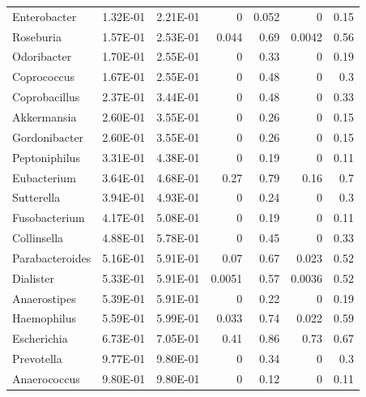 {\begin{longtable}{ | l | r | r | r | r | r | r  | }
		Enterobacter & 1.32E-01 & 2.21E-01 & 0 & 0.052 & 0 & 0.15 \\ 
		Roseburia & 1.57E-01 & 2.53E-01 & 0.044 & 0.69 & 0.0042 & 0.56 \\ 
		Odoribacter & 1.70E-01 & 2.55E-01 & 0 & 0.33 & 0 & 0.19 \\ 
		Coprococcus & 1.67E-01 & 2.55E-01 & 0 & 0.48 & 0 & 0.3 \\ 
		Coprobacillus & 2.37E-01 & 3.44E-01 & 0 & 0.48 & 0 & 0.33 \\ 
		Akkermansia & 2.60E-01 & 3.55E-01 & 0 & 0.26 & 0 & 0.15 \\ 
		Gordonibacter & 2.60E-01 & 3.55E-01 & 0 & 0.26 & 0 & 0.15 \\ 
		Peptoniphilus & 3.31E-01 & 4.38E-01 & 0 & 0.19 & 0 & 0.11 \\ 
		Eubacterium & 3.64E-01 & 4.68E-01 & 0.27 & 0.79 & 0.16 & 0.7 \\ 
		Sutterella & 3.94E-01 & 4.93E-01 & 0 & 0.24 & 0 & 0.3 \\ 
		Fusobacterium & 4.17E-01 & 5.08E-01 & 0 & 0.19 & 0 & 0.11 \\ 
		Collinsella & 4.88E-01 & 5.78E-01 & 0 & 0.45 & 0 & 0.33 \\ 
		Parabacteroides & 5.16E-01 & 5.91E-01 & 0.07 & 0.67 & 0.023 & 0.52 \\ 
		Dialister & 5.33E-01 & 5.91E-01 & 0.0051 & 0.57 & 0.0036 & 0.52 \\ 
		Anaerostipes & 5.39E-01 & 5.91E-01 & 0 & 0.22 & 0 & 0.19 \\ 
		Haemophilus & 5.59E-01 & 5.99E-01 & 0.033 & 0.74 & 0.022 & 0.59 \\ 
		Escherichia & 6.73E-01 & 7.05E-01 & 0.41 & 0.86 & 0.73 & 0.67 \\ 
		Prevotella & 9.77E-01 & 9.80E-01 & 0 & 0.34 & 0 & 0.3 \\ 
		Anaerococcus & 9.80E-01 & 9.80E-01 & 0 & 0.12 & 0 & 0.11
		
	\end{longtable}
}









